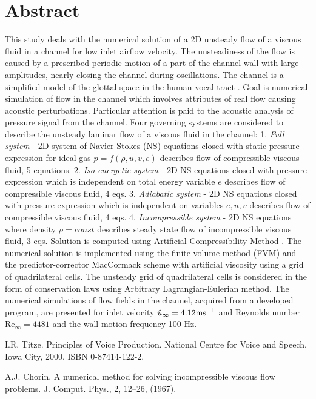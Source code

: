 \documentclass[article,A4,11pt]{llncs}%
\begin{document}
\section*{Abstract}
This study deals with the numerical solution of a 2D unsteady flow of a viscous fluid in a channel for low inlet airflow velocity. The unsteadiness of the flow is caused by a prescribed periodic motion of a part of the channel wall with large amplitudes, nearly closing the channel during oscillations. The channel is a simplified model of the glottal space in the human vocal tract \cite{Principles of Voice Production}. Goal is numerical simulation of flow in the channel which involves attributes of real flow causing acoustic perturbations. Particular attention is paid to the acoustic analysis of pressure signal from the channel. Four governing systems are considered to describe the unsteady laminar flow of a viscous fluid in the channel: 1. {\it Full system} - 2D system of Navier-Stokes (NS) equations closed with static pressure expression for ideal gas $p=f(\rho, u, v, e)$ describes flow of compressible viscous fluid, 5 equations. 2. {\it Iso-energetic system} - 2D NS equations closed with pressure expression which is independent on total energy variable $e$ describes flow of compressible viscous fluid, 4 eqs. 3. {\it Adiabatic system} - 2D NS equations closed with pressure expression which is independent on variables $e,u,v$ describes flow of compressible viscous fluid, 4 eqs. 4. {\it Incompressible system} - 2D NS equations where density $\rho=const$ describes steady state flow of incompressible viscous fluid, 3 eqs. Solution is computed using Artificial Compressibility Method \cite{A numerical method for solving incompressible viscous flow problems}. The numerical solution is implemented using the finite volume method (FVM) and the predictor-corrector MacCormack scheme with artificial viscosity using a grid of quadrilateral cells. The unsteady grid of quadrilateral cells is considered in the form of conservation laws using Arbitrary Lagrangian-Eulerian method. The numerical simulations of flow fields in the channel, acquired from a developed program, are presented for inlet velocity $\hat u_{\infty}=4.12 {\rm ms^{-1}}$ and Reynolds number Re$_{\infty} = 4481$ and the wall motion frequency 100 Hz.


\begin{thebibliography}{10}
{\sc I.R. Titze}. {Principles of Voice Production}. National Centre for Voice and Speech, Iowa City, 2000. ISBN 0-87414-122-2.

{\sc A.J. Chorin}. {A numerical method for solving incompressible viscous flow problems}. J. Comput. Phys., 2, 12–26, (1967).
\end{thebibliography}
\end{document}
